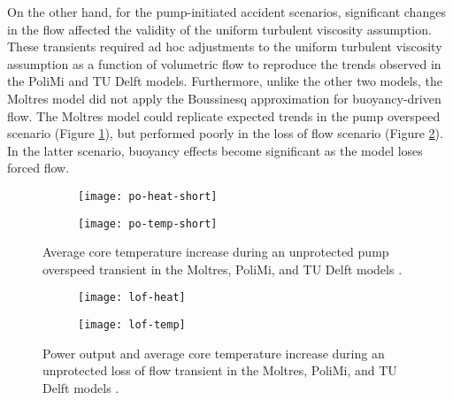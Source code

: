 On the other hand, for the pump-initiated accident scenarios, significant
changes in the flow affected the validity of the uniform turbulent viscosity
assumption. These transients required ad hoc adjustments to the uniform
turbulent viscosity assumption as a function of volumetric flow to reproduce
the trends observed in the PoliMi and TU Delft models. Furthermore, unlike the
other two models, the Moltres model did not apply the Boussinesq approximation
for buoyancy-driven flow. The Moltres model could replicate expected trends in
the pump overspeed scenario (Figure \ref{fig:poshort}), but performed
poorly in the loss of flow scenario (Figure \ref{fig:lof}). In the latter
scenario, buoyancy effects become significant as the model loses forced flow.

\begin{figure}[htb!]
    \centering
    \begin{subfigure}[t]{.485\textwidth}
        \centering
        \texttt{[image: po-heat-short]}
    \end{subfigure}
    \hfill
    \begin{subfigure}[t]{.485\textwidth}
        \centering
        \texttt{[image: po-temp-short]}
    \end{subfigure}
    \caption{Average core temperature increase during
    an unprotected pump overspeed transient in the Moltres, PoliMi, and
    TU Delft models \cite{fiorina_modelling_2014}.}
    \label{fig:poshort}
\end{figure}

\begin{figure}[htb!]
    \centering
    \begin{subfigure}[t]{.485\textwidth}
        \centering
        \texttt{[image: lof-heat]}
    \end{subfigure}
    \hfill
    \begin{subfigure}[t]{.485\textwidth}
        \centering
        \texttt{[image: lof-temp]}
    \end{subfigure}
    \caption{Power output and average core temperature increase during
    an unprotected loss of flow transient in the Moltres, PoliMi, and
    TU Delft models \cite{fiorina_modelling_2014}.}
    \label{fig:lof}
\end{figure}


